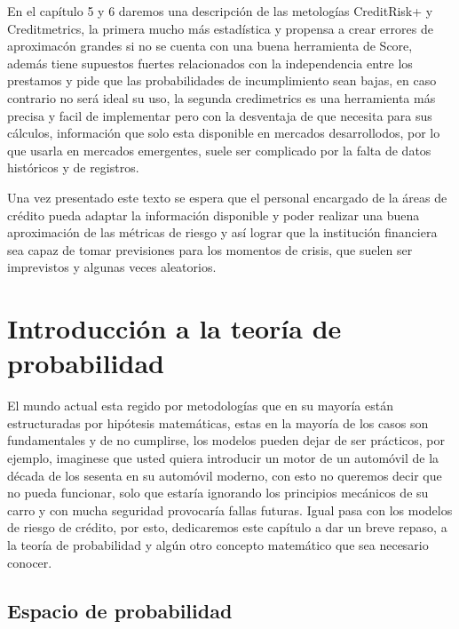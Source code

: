 \documentclass[
  12pt,
]{krantz}
\theoremstyle{definition}
\theoremstyle{definition}
\theoremstyle{definition}
\theoremstyle{remark}
\begin{document}
En el capítulo 5 y 6 daremos una descripción de las metologías CreditRisk+ y Creditmetrics, la primera mucho más estadística y propensa a crear errores de aproximacón grandes si no se cuenta con una buena herramienta de Score, además tiene supuestos fuertes relacionados con la independencia entre los prestamos y pide que las probabilidades de incumplimiento sean bajas, en caso contrario no será ideal su uso, la segunda credimetrics es una herramienta más precisa y facil de implementar pero con la desventaja de que necesita para sus cálculos, información que solo esta disponible en mercados desarrollodos, por lo que usarla en mercados emergentes, suele ser complicado por la falta de datos históricos y de registros.

Una vez presentado este texto se espera que el personal encargado de la áreas de crédito pueda adaptar la información disponible y poder realizar una buena aproximación de las métricas de riesgo y así lograr que la institución financiera sea capaz de tomar previsiones para los momentos de crisis, que suelen ser imprevistos y algunas veces aleatorios.

\mainmatter

\hypertarget{introduccion-a-la-teoria-de-probabilidad}{%
\chapter{Introducción a la teoría de probabilidad}\label{introduccion-a-la-teoria-de-probabilidad}}

El mundo actual esta regido por metodologías que en su mayoría están estructuradas por hipótesis matemáticas, estas en la mayoría de los casos son fundamentales y de no cumplirse, los modelos pueden dejar de ser prácticos, por ejemplo, imaginese que usted quiera introducir un motor de un automóvil de la década de los sesenta en su automóvil moderno, con esto no queremos decir que no pueda funcionar, solo que estaría ignorando los principios mecánicos de su carro y con mucha seguridad provocaría fallas futuras. Igual pasa con los modelos de riesgo de crédito, por esto, dedicaremos este capítulo a dar un breve repaso, a la teoría de probabilidad y algún otro concepto matemático que sea necesario conocer.

\hypertarget{espacio-de-probabilidad}{%
\section{Espacio de probabilidad}\label{espacio-de-probabilidad}}
\end{document}
